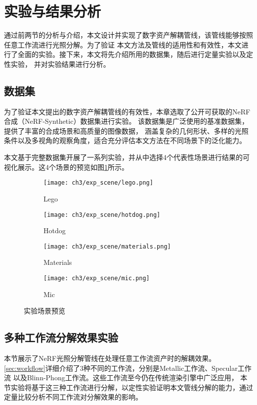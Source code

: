 \section{实验与结果分析}
通过前两节的分析与介绍，本文设计并实现了数字资产解耦管线，该管线能够按照任意工作流进行光照分解。为了验证
本文方法及管线的适用性和有效性，本文进行了全面的实验。接下来，本文将先介绍所用的数据集，随后进行定量实验以及定性实验，
并对实验结果进行分析。
\subsection{数据集}

为了验证本文提出的数字资产解耦管线的有效性，本章选取了公开可获取的NeRF合成（NeRF-Synthetic）数据集进行实验。
该数据集是广泛使用的基准数据集，提供了丰富的合成场景和高质量的图像数据，
涵盖复杂的几何形状、多样的光照条件以及多视角的观察角度，适合充分评估本文方法在不同场景下的泛化能力。

本文基于完整数据集开展了一系列实验，并从中选择4个代表性场景进行结果的可视化展示。这4个场景的预览如图\ref{fig:exp_scene}所示。

\begin{figure}[H]
  \centering
  \begin{subfigure}[t]{0.24\textwidth}
    \centering
    \texttt{[image: ch3/exp\_scene/lego.png]}
    \caption{Lego}
  \end{subfigure}
  \begin{subfigure}[t]{0.24\textwidth}
    \centering
    \texttt{[image: ch3/exp\_scene/hotdog.png]}
    \caption{Hotdog}
  \end{subfigure}
  \begin{subfigure}[t]{0.24\textwidth}
    \centering
    \texttt{[image: ch3/exp\_scene/materials.png]}
    \caption{Materials}
  \end{subfigure}
  \begin{subfigure}[t]{0.24\textwidth}
    \centering
    \texttt{[image: ch3/exp\_scene/mic.png]}
    \caption{Mic}
  \end{subfigure}
  \caption{实验场景预览}
  \label{fig:exp_scene}
\end{figure}

\subsection{多种工作流分解效果实验}
本节展示了NeRF光照分解管线在处理任意工作流资产时的解耦效果。
\ref{sec:workflow}详细介绍了3种不同的工作流，分别是Metallic工作流、Specular工作流
以及Blinn-Phong工作流。这些工作流至今仍在传统渲染引擎中广泛应用，
本节实验将基于这三种工作流进行分解，以定性实验证明本文管线分解的能力，通过定量比较分析不同工作流对分解效果的影响。


